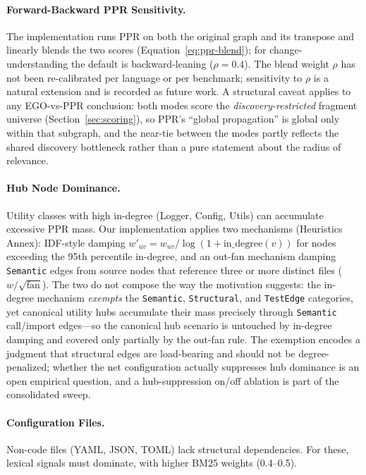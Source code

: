 \documentclass[11pt, a4paper]{article}
\begin{document}
\paragraph{Forward-Backward PPR Sensitivity.}
The implementation runs PPR on both the original graph and its transpose and linearly blends the two scores (Equation~\ref{eq:ppr-blend}); for change-understanding the default is backward-leaning ($\rho{=}0.4$). The blend weight $\rho$ has not been re-calibrated per language or per benchmark; sensitivity to $\rho$ is a natural extension and is recorded as future work. A structural caveat applies to any EGO-vs-PPR conclusion: both modes score the \emph{discovery-restricted} fragment universe (Section~\ref{sec:scoring}), so PPR's ``global propagation'' is global only within that subgraph, and the near-tie between the modes partly reflects the shared discovery bottleneck rather than a pure statement about the radius of relevance.

\paragraph{Hub Node Dominance.}
Utility classes with high in-degree (Logger, Config, Utils) can accumulate excessive PPR mass. Our implementation applies two mechanisms (Heuristics Annex): IDF-style damping $w'_{uv} = w_{uv} / \log(1 + \text{in\_degree}(v))$ for nodes exceeding the 95th percentile in-degree, and an out-fan mechanism damping \texttt{Semantic} edges from source nodes that reference three or more distinct files ($w / \sqrt{\mathrm{fan}}$). The two do not compose the way the motivation suggests: the in-degree mechanism \emph{exempts} the \texttt{Semantic}, \texttt{Structural}, and \texttt{TestEdge} categories, yet canonical utility hubs accumulate their mass precisely through \texttt{Semantic} call/import edges---so the canonical hub scenario is untouched by in-degree damping and covered only partially by the out-fan rule. The exemption encodes a judgment that structural edges are load-bearing and should not be degree-penalized; whether the net configuration actually suppresses hub dominance is an open empirical question, and a hub-suppression on/off ablation is part of the consolidated sweep.

\paragraph{Configuration Files.}
Non-code files (YAML, JSON, TOML) lack structural dependencies. For these, lexical signals must dominate, with higher BM25 weights (0.4--0.5).
\end{document}
